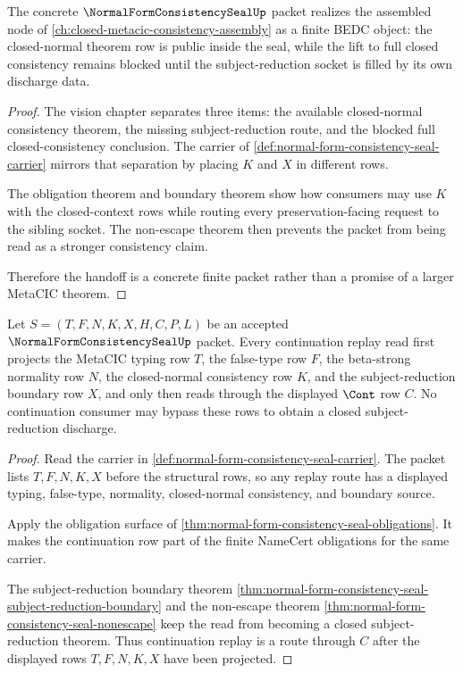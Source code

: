\begin{theorem}
\label{thm:normal-form-consistency-seal-vision-handoff}
The concrete $\NormalFormConsistencySealUp$ packet realizes the assembled node
of \autoref{ch:closed-metacic-consistency-assembly} as a finite BEDC object:
the closed-normal theorem row is public inside the seal, while the lift to full
closed consistency remains blocked until the subject-reduction socket is
filled by its own discharge data.
\end{theorem}
\begin{proof}
The vision chapter separates three items: the available closed-normal
consistency theorem, the missing subject-reduction route, and the blocked full
closed-consistency conclusion. The carrier of
\autoref{def:normal-form-consistency-seal-carrier} mirrors that separation by
placing $K$ and $X$ in different rows.

The obligation theorem and boundary theorem show how consumers may use $K$
with the closed-context rows while routing every preservation-facing request to
the sibling socket. The non-escape theorem then prevents the packet from being
read as a stronger consistency claim.

Therefore the handoff is a concrete finite packet rather than a promise of a
larger MetaCIC theorem.
\end{proof}

\begin{theorem}
\label{thm:normal-form-consistency-seal-continuation-replay}
Let $S=(T,F,N,K,X,H,C,P,L)$ be an accepted
$\NormalFormConsistencySealUp$ packet. Every continuation replay read first
projects the MetaCIC typing row $T$, the false-type row $F$, the
beta-strong normality row $N$, the closed-normal consistency row $K$, and the
subject-reduction boundary row $X$, and only then reads through the displayed
$\Cont$ row $C$. No continuation consumer may bypass these rows to obtain a
closed subject-reduction discharge.
\end{theorem}
\begin{proof}
Read the carrier in
\autoref{def:normal-form-consistency-seal-carrier}. The packet lists
$T,F,N,K,X$ before the structural rows, so any replay route has a displayed
typing, false-type, normality, closed-normal consistency, and boundary source.

Apply the obligation surface of
\autoref{thm:normal-form-consistency-seal-obligations}. It makes the
continuation row part of the finite NameCert obligations for the same carrier.

The subject-reduction boundary theorem
\autoref{thm:normal-form-consistency-seal-subject-reduction-boundary} and the
non-escape theorem
\autoref{thm:normal-form-consistency-seal-nonescape} keep the read from
becoming a closed subject-reduction theorem. Thus continuation replay is a
route through $C$ after the displayed rows $T,F,N,K,X$ have been projected.
\end{proof}

